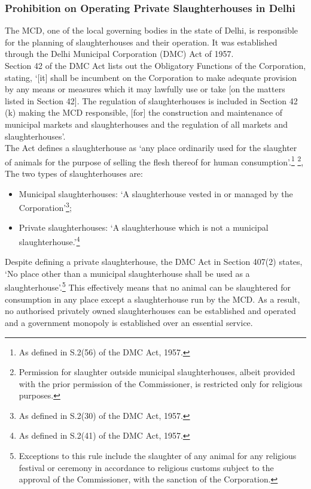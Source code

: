 \documentclass[a4paper, 12pt, twoside]{article}
\begin{document}
\subsubsection{Prohibition on Operating Private Slaughterhouses in Delhi}

The MCD, one of the local governing bodies in the state of Delhi, is responsible for the planning of slaughterhouses and their operation. It was established through the Delhi Municipal Corporation (DMC) Act of 1957. \\

Section 42 of the DMC Act lists out the Obligatory Functions of the Corporation, stating, ‘[it] shall be incumbent on the Corporation to make adequate provision by any means or measures which it may lawfully use or take [on the matters listed in Section 42]. The regulation of slaughterhouses is included in Section 42 (k) making the MCD responsible, [for] the construction and maintenance of municipal markets and slaughterhouses and the regulation of all markets and slaughterhouses’.\\

The Act defines a slaughterhouse as ‘any place ordinarily used for the slaughter of animals for the purpose of selling the flesh thereof for human consumption’.\footnote{ As defined in S.2(56) of the DMC Act, 1957.}  \footnote{ Permission for slaughter outside municipal slaughterhouses, albeit provided with the prior permission of the Commissioner, is restricted only for religious purposes.}, The two types of slaughterhouses are:

\begin{itemize}
\item Municipal slaughterhouses: ‘A slaughterhouse vested in or managed by the Corporation’\footnote{ As defined in S.2(30) of the DMC Act, 1957.};
\item Private slaughterhouses: ‘A slaughterhouse which is not a municipal slaughterhouse.’\footnote{ As defined in S.2(41) of the DMC Act, 1957.}
\end{itemize}

Despite defining a private slaughterhouse, the DMC Act in Section 407(2) states, ‘No place other than a municipal slaughterhouse shall be used as a slaughterhouse’.\footnote{ Exceptions to this rule include the slaughter of any animal for any religious festival or ceremony in accordance to religious customs subject to the approval of the Commissioner, with the sanction of the Corporation.} This effectively means that no animal can be slaughtered for consumption in any place except a slaughterhouse run by the MCD. As a result, no authorised privately owned slaughterhouses can be established and operated and a government monopoly is established over an essential service. 
\end{document}
